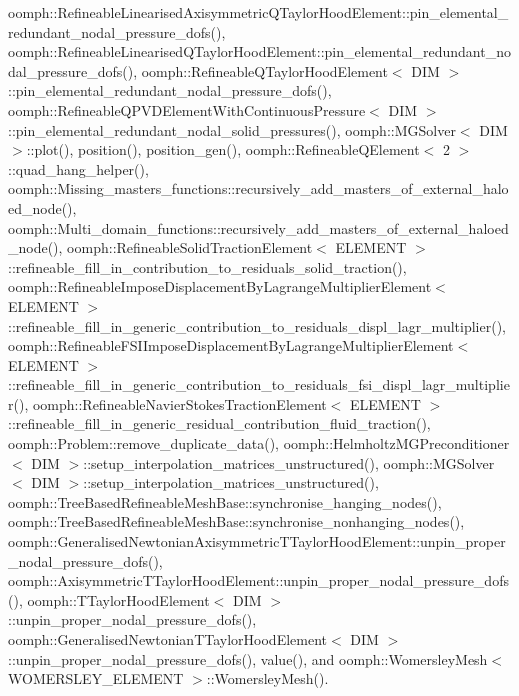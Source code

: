 oomph\+::\+Refineable\+Linearised\+Axisymmetric\+Q\+Taylor\+Hood\+Element\+::pin\+\_\+elemental\+\_\+redundant\+\_\+nodal\+\_\+pressure\+\_\+dofs(), oomph\+::\+Refineable\+Linearised\+Q\+Taylor\+Hood\+Element\+::pin\+\_\+elemental\+\_\+redundant\+\_\+nodal\+\_\+pressure\+\_\+dofs(), oomph\+::\+Refineable\+Q\+Taylor\+Hood\+Element$<$ D\+I\+M $>$\+::pin\+\_\+elemental\+\_\+redundant\+\_\+nodal\+\_\+pressure\+\_\+dofs(), oomph\+::\+Refineable\+Q\+P\+V\+D\+Element\+With\+Continuous\+Pressure$<$ D\+I\+M $>$\+::pin\+\_\+elemental\+\_\+redundant\+\_\+nodal\+\_\+solid\+\_\+pressures(), oomph\+::\+M\+G\+Solver$<$ D\+I\+M $>$\+::plot(), position(), position\+\_\+gen(), oomph\+::\+Refineable\+Q\+Element$<$ 2 $>$\+::quad\+\_\+hang\+\_\+helper(), oomph\+::\+Missing\+\_\+masters\+\_\+functions\+::recursively\+\_\+add\+\_\+masters\+\_\+of\+\_\+external\+\_\+haloed\+\_\+node(), oomph\+::\+Multi\+\_\+domain\+\_\+functions\+::recursively\+\_\+add\+\_\+masters\+\_\+of\+\_\+external\+\_\+haloed\+\_\+node(), oomph\+::\+Refineable\+Solid\+Traction\+Element$<$ E\+L\+E\+M\+E\+N\+T $>$\+::refineable\+\_\+fill\+\_\+in\+\_\+contribution\+\_\+to\+\_\+residuals\+\_\+solid\+\_\+traction(), oomph\+::\+Refineable\+Impose\+Displacement\+By\+Lagrange\+Multiplier\+Element$<$ E\+L\+E\+M\+E\+N\+T $>$\+::refineable\+\_\+fill\+\_\+in\+\_\+generic\+\_\+contribution\+\_\+to\+\_\+residuals\+\_\+displ\+\_\+lagr\+\_\+multiplier(), oomph\+::\+Refineable\+F\+S\+I\+Impose\+Displacement\+By\+Lagrange\+Multiplier\+Element$<$ E\+L\+E\+M\+E\+N\+T $>$\+::refineable\+\_\+fill\+\_\+in\+\_\+generic\+\_\+contribution\+\_\+to\+\_\+residuals\+\_\+fsi\+\_\+displ\+\_\+lagr\+\_\+multiplier(), oomph\+::\+Refineable\+Navier\+Stokes\+Traction\+Element$<$ E\+L\+E\+M\+E\+N\+T $>$\+::refineable\+\_\+fill\+\_\+in\+\_\+generic\+\_\+residual\+\_\+contribution\+\_\+fluid\+\_\+traction(), oomph\+::\+Problem\+::remove\+\_\+duplicate\+\_\+data(), oomph\+::\+Helmholtz\+M\+G\+Preconditioner$<$ D\+I\+M $>$\+::setup\+\_\+interpolation\+\_\+matrices\+\_\+unstructured(), oomph\+::\+M\+G\+Solver$<$ D\+I\+M $>$\+::setup\+\_\+interpolation\+\_\+matrices\+\_\+unstructured(), oomph\+::\+Tree\+Based\+Refineable\+Mesh\+Base\+::synchronise\+\_\+hanging\+\_\+nodes(), oomph\+::\+Tree\+Based\+Refineable\+Mesh\+Base\+::synchronise\+\_\+nonhanging\+\_\+nodes(), oomph\+::\+Generalised\+Newtonian\+Axisymmetric\+T\+Taylor\+Hood\+Element\+::unpin\+\_\+proper\+\_\+nodal\+\_\+pressure\+\_\+dofs(), oomph\+::\+Axisymmetric\+T\+Taylor\+Hood\+Element\+::unpin\+\_\+proper\+\_\+nodal\+\_\+pressure\+\_\+dofs(), oomph\+::\+T\+Taylor\+Hood\+Element$<$ D\+I\+M $>$\+::unpin\+\_\+proper\+\_\+nodal\+\_\+pressure\+\_\+dofs(), oomph\+::\+Generalised\+Newtonian\+T\+Taylor\+Hood\+Element$<$ D\+I\+M $>$\+::unpin\+\_\+proper\+\_\+nodal\+\_\+pressure\+\_\+dofs(), value(), and oomph\+::\+Womersley\+Mesh$<$ W\+O\+M\+E\+R\+S\+L\+E\+Y\+\_\+\+E\+L\+E\+M\+E\+N\+T $>$\+::\+Womersley\+Mesh().


